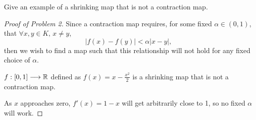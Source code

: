 \documentclass[../9extra]{subfiles}
\begin{document}
\begin{problem}[2]
Give an example of a shrinking map that is not a contraction map.
\end{problem}
\begin{proof}[Proof of Problem 2]
	Since a contraction map requires, for some fixed $\alpha \in (0,1)$, that $\forall x,y \in K,\, x \neq y$, \[
		|f(x)-f(y)| < \alpha|x-y|
		,\]
	then we wish to find a map such that this relationship will not hold for any fixed choice of $\alpha$.

	$f:[0,1]\longrightarrow \mathbb{R}$ defined as $f(x)=x - \frac{x^2}{2}$ is a shrinking map that is not a contraction map.

	As $x$ approaches zero, $f'(x)=1-x$ will get arbitrarily close to 1, so no fixed $\alpha$ will work.
\end{proof}
\end{document}
